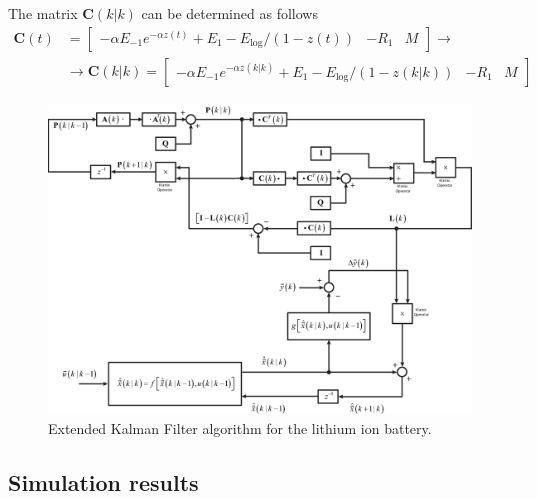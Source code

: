 \documentclass[11pt,a4paper,oneside]{book}
\numberwithin{equation}{section}
\theoremstyle{it}
\theoremstyle{definition}
\begin{document}
\vspace{5mm}
The matrix $\mathbf{C}(k|k)$ can be determined as follows
\begin{equation}
	\begin{aligned}
		\mathbf{C}(t) &= \begin{bmatrix}
			-\alpha E_{-1}e^{-\alpha z(t)}+E_1-E_\text{log}/(1-z(t)) & -R_1 & M
		\end{bmatrix} \rightarrow \\[6pt] 
		&\rightarrow \mathbf{C}(k|k) =   
		\begin{bmatrix}
			-\alpha E_{-1}e^{-\alpha z(k|k)}+E_1-E_\text{log}/(1-z(k|k)) & -R_1 & M
		\end{bmatrix}
	\end{aligned}
\end{equation}
\begin{figure}[H]
	\centering
	\includegraphics[width = 450pt, angle = 0, 
	keepaspectratio]{figures/lithium_ion_battery/EKF.eps}
	\captionsetup{width=0.5\textwidth, font=small}		
	\caption{Extended Kalman Filter algorithm for the lithium ion battery.}
	\label{lithium_ion_battery_EKF}
\end{figure}

\subsection{Simulation results}
\end{document}

